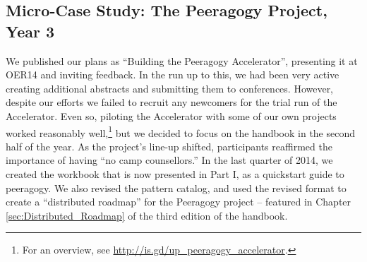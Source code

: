 \subsection{{\tiny Micro-}Case Study: The Peeragogy Project, Year 3}

We published our plans as ``Building the Peeragogy Accelerator'',
presenting it at OER14 and inviting feedback.  In the run up to this,
we had been very active creating additional abstracts and submitting
them to conferences.  However, despite our efforts we failed to
recruit any newcomers for the trial run of the Accelerator.  Even so,
piloting the Accelerator with some of our own projects worked
reasonably well,\footnote{For an overview,
see \url{http://is.gd/up_peeragogy_accelerator}.} but we decided to
focus on the handbook in the second half of the year.  As the
project's line-up shifted, participants reaffirmed the importance of
having ``no camp counsellors.''  In the last quarter of 2014, we
created the workbook that is now presented in Part I, as a quickstart
guide to peeragogy.  We also revised the pattern catalog, and used the
revised format to create a ``distributed roadmap'' for the Peeragogy
project -- featured in Chapter \ref{sec:Distributed_Roadmap} of the third
edition of the handbook.

